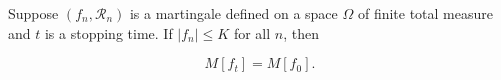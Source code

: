 Suppose $(f_n, \mathcal{R}_n)$ is a martingale defined on a space $\Omega$ of finite total measure and $t$ is a stopping time. If $|f_n| \leq K$ for all $n$, then

$$M[f_t] = M[f_0].$$
